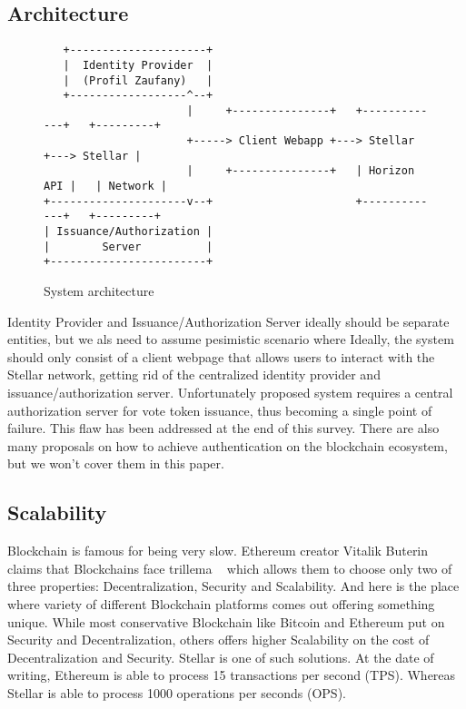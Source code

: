 \documentclass[runningheads]{llncs}
\begin{document}
\subsection{Architecture}
\begin{figure}
\begin{verbatim}
   +---------------------+
   |  Identity Provider  |
   |  (Profil Zaufany)   |
   +------------------^--+
                      |     +---------------+   +-------------+   +---------+
                      +-----> Client Webapp +---> Stellar     +---> Stellar |
                      |     +---------------+   | Horizon API |   | Network |
+---------------------v--+                      +-------------+   +---------+
| Issuance/Authorization |
|        Server          |
+------------------------+
\end{verbatim}
\caption{System architecture}
\label{fig:ascii-box}
\end{figure} 

Identity Provider and Issuance/Authorization Server ideally should be separate entities, but we als need to assume pesimistic scenario where
Ideally, the system should only consist of a client webpage that allows users to interact with the Stellar network, getting rid of the centralized identity provider and issuance/authorization server. Unfortunately proposed system requires a central authorization server for vote token issuance, thus becoming a single point
of failure. This flaw has been addressed at the end of this survey. There are also many proposals on how to achieve authentication on the blockchain ecosystem, but we won't cover them in this paper.

\subsection{Scalability}

Blockchain is famous for being very slow. Ethereum creator Vitalik Buterin claims that Blockchains face trillema ~\cite{ethereum} which allows them to choose only two of three properties: Decentralization, Security and Scalability. And here is the place where variety of different Blockchain platforms comes out offering something unique. While most conservative Blockchain like Bitcoin and Ethereum put on Security and Decentralization, others offers higher Scalability on the cost of Decentralization and Security. Stellar is one of such solutions. 
At the date of writing, Ethereum is able to process 15 transactions per second (TPS). Whereas Stellar is able to process 1000 operations per seconds (OPS). 
\end{document}

